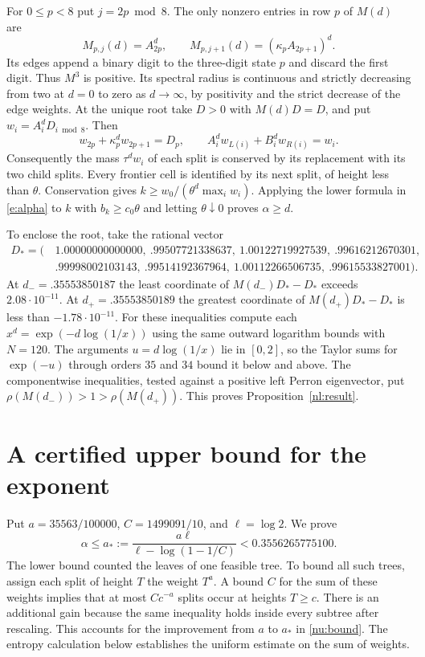 \documentclass[11pt]{article}
\numberwithin{equation}{section}
\begin{document}
For $0\le p<8$ put $j=2p\bmod8$. The only nonzero entries in
row $p$ of $M(d)$ are
\begin{equation}
        M_{p,j}(d)=A_{2p}^d,\qquad
        M_{p,j+1}(d)=(\kappa_p A_{2p+1})^d .
 \label{nl:matrix}
\end{equation}
Its edges append a binary digit to the three-digit state $p$ and
discard the first digit. Thus $M^3$ is positive. Its spectral
radius is continuous and strictly decreasing from two at $d=0$
to zero as $d\to\infty$, by positivity and the strict decrease of
the edge weights. At the unique root take $D>0$ with $M(d)D=D$,
and put $w_i=A_i^d D_{i\bmod8}$. Then
\[
 w_{2p}+\kappa_p^d w_{2p+1}=D_p,\qquad
 A_i^d w_{L(i)}+B_i^d w_{R(i)}=w_i.
\]
Consequently the mass $\tau^d w_i$ of each split is conserved
by its replacement with its two child splits. Every frontier cell
is identified by its next split, of height less than $\theta$.
Conservation gives $k\ge w_0/(\theta^d\max_i w_i)$. Applying
the lower formula in \eqref{e:alpha} to $k$ with $b_k\ge c_0\theta$ and letting
$\theta\downarrow0$ proves $\alpha\ge d$.

To enclose the root, take the rational vector
\[
\begin{split}
 D_*=(\,&1.00000000000000,\ .99507721338637,\ 1.00122719927539,\ .99616212670301,\\
       &.99998002103143,\ .99514192367964,\ 1.00112266506735,\ .99615533827001).
\end{split}
\]
At $d_-=.35553850187$ the least coordinate of $M(d_-)D_*-D_*$
exceeds $2.08\cdot10^{-11}$. At $d_+=.35553850189$ the greatest
coordinate of $M(d_+)D_*-D_*$ is less than $-1.78\cdot10^{-11}$.
For these inequalities compute each $x^d=\exp(-d\log(1/x))$
using the same outward logarithm bounds with $N=120$. The
arguments $u=d\log(1/x)$ lie in $[0,2]$, so the Taylor sums for
$\exp(-u)$ through orders $35$ and $34$ bound it below and above.
The componentwise inequalities, tested against a positive left
Perron eigenvector, put $\rho(M(d_-))>1>\rho(M(d_+))$. This proves
Proposition~\ref{nl:result}.

\section{A certified upper bound for the exponent}
\label{nu:section}

Put $a=35563/100000$, $C=1499091/10$, and $\ell=\log 2$.
We prove
\begin{equation}
 \alpha\le a_*:=\frac{a\ell}{\ell-\log(1-1/C)}
                  <0.3556265775100 .                         \label{nu:bound}
\end{equation}
The lower bound counted the leaves of one feasible tree. To bound
all such trees, assign each split of height $T$ the weight $T^a$.
A bound $C$ for the sum of these weights implies that at most
$C c^{-a}$ splits occur at heights $T\ge c$. There is an additional
gain because the same inequality holds inside every subtree after
rescaling. This accounts for the improvement from $a$ to $a_*$
in \eqref{nu:bound}. The entropy calculation below establishes the
uniform estimate on the sum of weights.
\end{document}
